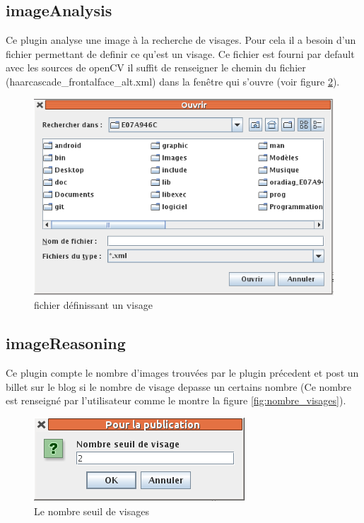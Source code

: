 \documentclass[a4paper , 12pt]{article}
\begin{document}
\subsection{imageAnalysis}
Ce plugin analyse une image à la recherche de visages. Pour cela il a besoin d'un fichier permettant de definir ce qu'est un visage. Ce fichier est fourni par default avec les sources de openCV il suffit de renseigner le chemin du fichier (haarcascade\_frontalface\_alt.xml) dans la fenêtre qui s'ouvre (voir figure \ref{fig:haar}).

\begin{figure}
  \includegraphics[scale=0.5]{images/figureHaar.png}
  \caption{fichier définissant un visage}
  \label{fig:haar}
\end{figure}

\subsection{imageReasoning}
Ce plugin compte le nombre d'images trouvées par le plugin précedent et post un billet sur le blog si le nombre de visage depasse un certains nombre (Ce nombre est renseigné par l'utilisateur comme le montre la figure \ref{fig:nombre_visages}).

\begin{figure}
  \includegraphics[scale=0.5]{images/nombre_visages.png}
  \caption{Le nombre seuil de visages}
  \label{fig:haar}
\end{figure}
\end{document}
